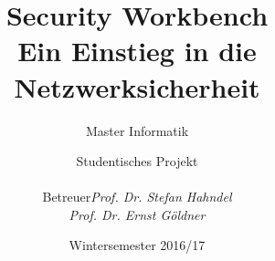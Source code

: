 

\title{Security Workbench\\ Ein Einstieg in die Netzwerksicherheit}
\subtitle{Master Informatik}
\subject{DOKUMENTATION}

\author{Studentisches Projekt \\[0.5cm]
\begin{tabular}{rl}
Betreuer & \emph{Prof. Dr. Stefan Hahndel}\\
 & \emph{Prof. Dr. Ernst Göldner}
\end{tabular}
}

\date{Wintersemester 2016/17}



\tableofcontents
\clearpage
\listoffigures
\clearpage

















